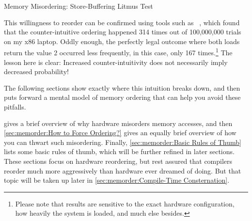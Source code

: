 \begin{listing}

\caption{Memory Misordering:
			     Store-Buffering Litmus Test}
\label{lst:memorder:Memory Misordering: Store-Buffering Litmus Test}
\end{listing}

\QuickQuizEnd

This willingness to reorder can be confirmed using tools such as
~\cite{Alglave:2014:HCM:2594291.2594347},
which found that the counter-intuitive ordering happened
314 times out of 100,000,000 trials on my x86 laptop.
Oddly enough, the perfectly legal outcome where both loads return the
value 2 occurred less frequently, in this case, only 167 times.\footnote{
	Please note that results are sensitive to the exact hardware
	configuration,
	how heavily the system is loaded, and much else besides.}
The lesson here is clear:
Increased counter-intuitivity does not necessarily imply decreased probability!

The following sections show exactly where this intuition breaks down,
and then puts forward a mental model of memory ordering that can help
you avoid these pitfalls.

gives a brief overview of why hardware misorders memory accesses, and then
\cref{sec:memorder:How to Force Ordering?}
gives an equally brief overview of how you can thwart such misordering.
Finally, \cref{sec:memorder:Basic Rules of Thumb}
lists some basic rules of thumb, which will be further refined in
later sections.
These sections focus on hardware reordering, but rest assured that compilers
reorder much more aggressively than hardware ever dreamed of doing.
But that topic will be taken up later in
\cref{sec:memorder:Compile-Time Consternation}.

